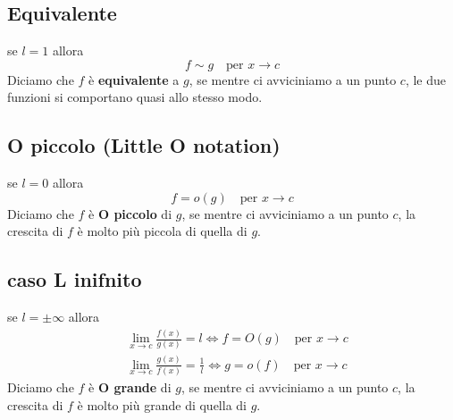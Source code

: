 \documentclass{book}
\begin{document}
\begin{definition}
  \subsection{Equivalente}
  se \(l = 1\) allora
  \[
    f \sim g \quad \text{per } x \to c
  \]
  Diciamo che \(f\) è \textbf{equivalente} a \(g\), se mentre ci avviciniamo a un punto \(c\), le due funzioni si comportano quasi allo stesso modo.
\end{definition}

\begin{definition}
  \subsection{O piccolo (Little O notation)}
  se \(l = 0\) allora
  \[
    f = o(g) \quad \text{per } x \to c
  \]
  Diciamo che \(f\) è \textbf{O piccolo} di \(g\), se mentre ci avviciniamo a un punto \(c\), la crescita di \(f\) è molto più piccola di quella di \(g\).
\end{definition}

\begin{definition}
  \subsection{caso L inifnito}
  se \(l = \pm \infty\) allora
  \begin{align*}
     & \lim_{x \to c} \frac{f(x)}{g(x)} = l \iff f = O(g) \quad \text{per } x \to c           \\
     & \lim_{x \to c} \frac{g(x)}{f(x)} = \frac{1}{l} \iff g = o(f) \quad \text{per } x \to c
  \end{align*}
  Diciamo che \(f\) è \textbf{O grande} di \(g\), se mentre ci avviciniamo a un punto \(c\), la crescita di \(f\) è molto più grande di quella di \(g\).
\end{definition}
\end{document}
